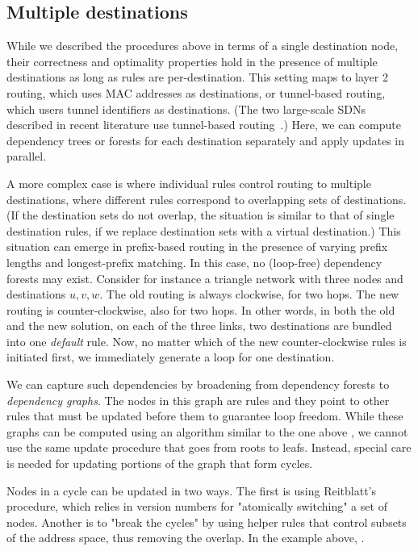 \subsection{Multiple destinations}

While we described the procedures above in terms of a single destination node, their correctness and optimality properties hold in the presence of multiple destinations as long as rules are per-destination. This setting maps to layer 2 routing, which uses MAC addresses as destinations, or tunnel-based routing, which users tunnel identifiers as destinations. (The two large-scale SDNs described in recent literature use tunnel-based routing~\cite{swan,b4}.) Here, we can compute dependency trees or forests for each destination separately and apply updates in parallel.

A more complex case is where individual rules control routing to multiple destinations, where different rules correspond to overlapping sets of destinations. (If the destination sets do not overlap, the situation is similar to that of single destination rules, if we replace destination sets with a virtual destination.) This situation can emerge in prefix-based routing in the presence of varying prefix lengths and longest-prefix matching. In this case, no (loop-free) dependency forests may exist.  Consider for instance a triangle network with three nodes and destinations $u,v,w$. The old routing is always clockwise, for two hops. The new routing is counter-clockwise, also for two hops. In other words, in both the old and the new solution, on each of the three links, two destinations are bundled into one \emph{default} rule. Now, no matter which of the new counter-clockwise rules is initiated first, we immediately generate a loop for one destination. 

We can capture such dependencies by broadening from dependency forests to {\em dependency graphs}. The nodes in this graph are rules and they point to other rules that must be updated before them to guarantee loop freedom. While these graphs can be computed using an algorithm similar to the one above , we cannot use the same update procedure that goes from roots to leafs. Instead, special care is needed for updating portions of the graph that form cycles. 

Nodes in a cycle can be updated in two ways. The first is using Reitblatt's procedure, which relies in version numbers for "atomically switching" a set of nodes. Another is to "break the cycles" by using helper rules that control subsets of the address space, thus removing the overlap. In the example above, . 

